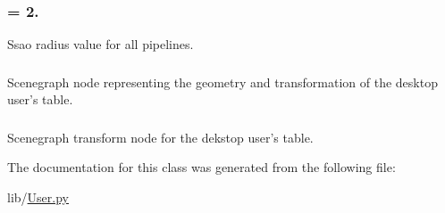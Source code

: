 \hypertarget{classlib_1_1User_1_1User_a08dc9a8a092cc9e8223a2ce1e4d68766}{
\subsubsection[{ssao\-\_\-radius}]{ = 2.}}\label{classlib_1_1User_1_1User_a08dc9a8a092cc9e8223a2ce1e4d68766}


\-Ssao radius value for all pipelines. 

\hypertarget{classlib_1_1User_1_1User_a6b26285528c0979839c12dc0794300c3}{
\subsubsection[{table\-\_\-avatar}]{}}\label{classlib_1_1User_1_1User_a6b26285528c0979839c12dc0794300c3}


\-Scenegraph node representing the geometry and transformation of the desktop user's table. 

\hypertarget{classlib_1_1User_1_1User_a227267a7e99f6ed9babb200558d580a8}{
\subsubsection[{table\-\_\-transform}]{}}\label{classlib_1_1User_1_1User_a227267a7e99f6ed9babb200558d580a8}


\-Scenegraph transform node for the dekstop user's table. 



\-The documentation for this class was generated from the following file\-:\begin{DoxyCompactItemize}
\item 
lib/\hyperlink{User_8py}{\-User.\-py}\end{DoxyCompactItemize}
